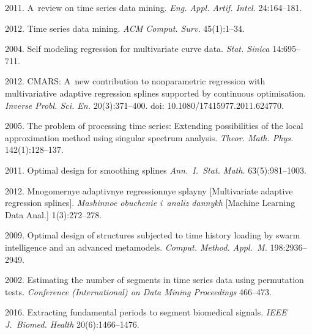 \begin{multicols}{2}
{{\begin{thebibliography}{99}
 2011. A~review on time series data mining. 
\textit{Eng. Appl. Artif. Intel.} 24:164--181.

 2012. Time series data mining. 
\textit{ACM Comput. Surv.} 45(1):1--34.

 2004. Self modeling regression for
 multivariate curve data. \textit{Stat. Sinica} 14:695--711.

 2012.
CMARS: A~new contribution to nonparametric regression 
with multivariative adaptive regression splines supported by continuous optimisation. 
\textit{Inverse Probl.  Sci.  En.} 20(3):371--400.
doi: 10.1080/17415977.2011.624770.

 2005. 
The problem of processing time series: Extending possibilities 
of the local approximation method using singular spectrum analysis. 
\textit{Theor. Math. Phys.} 142(1):128--137.

 2011. Optimal design for 
smoothing splines \textit{Ann.~I.~Stat. Math.} 
63(5):981--1003.

 2012. Mnogomernye adaptivnye regressionnye splayny 
[Multivariate adaptive regression splines]. \textit{Mashinnoe obuchenie 
i~analiz dannykh} [{Machine Learning Data Anal.}] 1(3):272--278.  



 2009. 
Optimal design of structures subjected to time history loading by swarm 
intelligence and an advanced metamodels. 
\textit{Comput. Method. Appl.~M.} 198:2936--2949.



 2002. Estimating the number of segments in time series data using 
 permutation tests. \textit{Conference (International) on Data Mining
 Proceedings} 466--473.

 2016. 
Extracting fundamental periods to segment biomedical signals. 
\textit{IEEE J.~Biomed. Health} 20(6):1466--1476.
\end{thebibliography}

 }
 }

\end{multicols}

